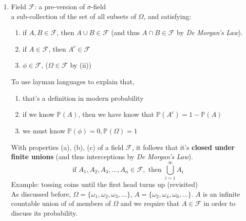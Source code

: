 \documentclass[11pt]{article}
\begin{document}
\begin{enumerate}
\item Field $\mathcal{F}$: a pre-version of $\sigma$-field \\
a sub-collection of the set of all subsets of $\Omega$, and satisfying:
\begin{enumerate}
\item if $A,B \in \mathcal{F}$, then $A \cup B \in \mathcal{F}$ (and thus $A \cap B \in \mathcal{F}$ by \textit{De Morgan's Law}).
\item if $A \in \mathcal{F}$, then $A^{c} \in \mathcal{F}$
\item $\phi \in \mathcal{F}$, ($\Omega \in \mathcal{F}$ by (ii))
\end{enumerate}
To use layman languages to explain that,
\begin{enumerate}
\item that's a definition in modern probability
\item if we know $\mathbb{P}(A)$, then we have know that $\mathbb{P}(A^{c})=1-\mathbb{P}(A)$
\item we must know $\mathbb{P}(\phi)=0, \mathbb{P}(\Omega)=1$
\end{enumerate}
With properties (a), (b), (c) of a field $\mathcal{F}$, it follows that it's \textbf{closed under finite unions} (and thus interceptions by \textit{De Morgan's Law}).
$$\text{if } A_1, A_2, A_3,..., A_n \in \mathcal{F}, \text{ then } \bigcup\limits_{i=1}^{\infty} A_i$$
Example: tossing coins until the first head turns up (revisited)\\
As discussed before, $\Omega = \{\omega _1, \omega _2, \omega _3, ...\}$, $A = \{\omega _2, \omega _4, \omega _6, ...\}$. $A$ is an infinite countable union of of members of $\Omega$ and we require that $A \in \mathcal{F}$ in order to discuss its probability. 


\end{enumerate}
\end{document}
